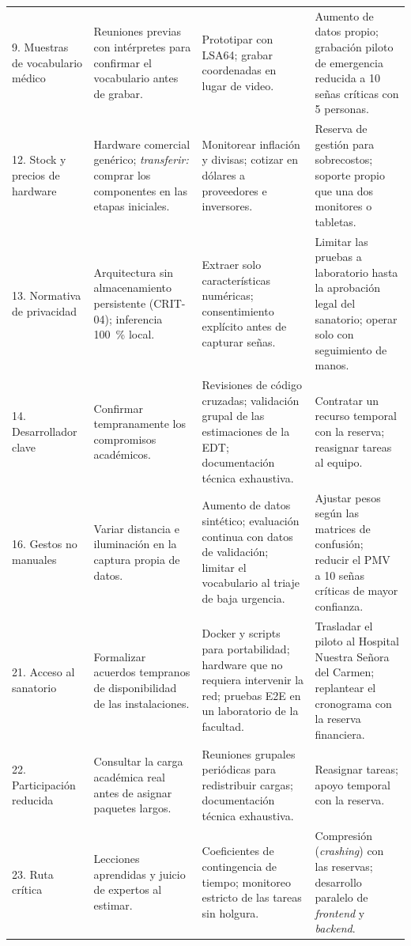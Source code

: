 {\begin{longtable}{@{}p{1.5cm}p{3.5cm}p{5.0cm}p{4.9cm}@{}}
9. Muestras de vocabulario médico & Reuniones previas con intérpretes para confirmar el vocabulario antes de grabar. & Prototipar con LSA64; grabar coordenadas en lugar de video. & Aumento de datos propio; grabación piloto de emergencia reducida a 10 señas críticas con 5 personas. \\
12. Stock y precios de hardware & Hardware comercial genérico; \emph{transferir:} comprar los componentes en las etapas iniciales. & Monitorear inflación y divisas; cotizar en dólares a proveedores e inversores. & Reserva de gestión para sobrecostos; soporte propio que una dos monitores o tabletas. \\
13. Normativa de privacidad & Arquitectura sin almacenamiento persistente (CRIT-04); inferencia 100~\% local. & Extraer solo características numéricas; consentimiento explícito antes de capturar señas. & Limitar las pruebas a laboratorio hasta la aprobación legal del sanatorio; operar solo con seguimiento de manos. \\
14. Desarrollador clave & Confirmar tempranamente los compromisos académicos. & Revisiones de código cruzadas; validación grupal de las estimaciones de la EDT; documentación técnica exhaustiva. & Contratar un recurso temporal con la reserva; reasignar tareas al equipo. \\
16. Gestos no manuales & Variar distancia e iluminación en la captura propia de datos. & Aumento de datos sintético; evaluación continua con datos de validación; limitar el vocabulario al triaje de baja urgencia. & Ajustar pesos según las matrices de confusión; reducir el PMV a 10 señas críticas de mayor confianza. \\
21. Acceso al sanatorio & Formalizar acuerdos tempranos de disponibilidad de las instalaciones. & Docker y scripts para portabilidad; hardware que no requiera intervenir la red; pruebas E2E en un laboratorio de la facultad. & Trasladar el piloto al Hospital Nuestra Señora del Carmen; replantear el cronograma con la reserva financiera. \\
22. Participación reducida & Consultar la carga académica real antes de asignar paquetes largos. & Reuniones grupales periódicas para redistribuir cargas; documentación técnica exhaustiva. & Reasignar tareas; apoyo temporal con la reserva. \\
23. Ruta crítica & Lecciones aprendidas y juicio de expertos al estimar. & Coeficientes de contingencia de tiempo; monitoreo estricto de las tareas sin holgura. & Compresión (\emph{crashing}) con las reservas; desarrollo paralelo de \emph{frontend} y \emph{backend}. \\

\end{longtable}}
